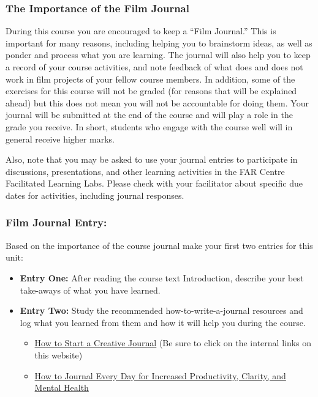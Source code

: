 \documentclass[
]{book}
\providecommand{\tightlist}{%
  \setlength{\itemsep}{0pt}\setlength{\parskip}{0pt}}
\begin{document}
\begin{reflect}
\hypertarget{the-importance-of-the-film-journal}{%
\subsubsection*{The Importance of the Film Journal}\label{the-importance-of-the-film-journal}}

During this course you are encouraged to keep a ``Film Journal.'' This is important for many reasons, including helping you to brainstorm ideas, as well as ponder and process what you are learning. The journal will also help you to keep a record of your course activities, and note feedback of what does and does not work in film projects of your fellow course members. In addition, some of the exercises for this course will not be graded (for reasons that will be explained ahead) but this does not mean you will not be accountable for doing them. Your journal will be submitted at the end of the course and will play a role in the grade you receive. In short, students who engage with the course well will in general receive higher marks.

Also, note that you may be asked to use your journal entries to participate in discussions, presentations, and other learning activities in the FAR Centre Facilitated Learning Labs. Please check with your facilitator about specific due dates for activities, including journal responses.

\hypertarget{film-journal-entry}{%
\subsubsection*{Film Journal Entry:}\label{film-journal-entry}}

Based on the importance of the course journal make your first two entries for this unit:

\begin{itemize}
\tightlist
\item
  \textbf{Entry One:} After reading the course text Introduction, describe your best take-aways of what you have learned.
\item
  \textbf{Entry Two:} Study the recommended how-to-write-a-journal resources and log what you learned from them and how it will help you during the course.

  \begin{itemize}
  \tightlist
  \item
    \href{https://karenbanes.com/how-to-start-a-creative-journal}{How to Start a Creative Journal} (Be sure to click on the internal links on this website)\\
  \item
    \href{https://www.youtube.com/watch?v=hUTWo7_W0lc}{How to Journal Every Day for Increased Productivity, Clarity, and Mental Health}
  \end{itemize}
\end{itemize}
\end{reflect}
\end{document}

